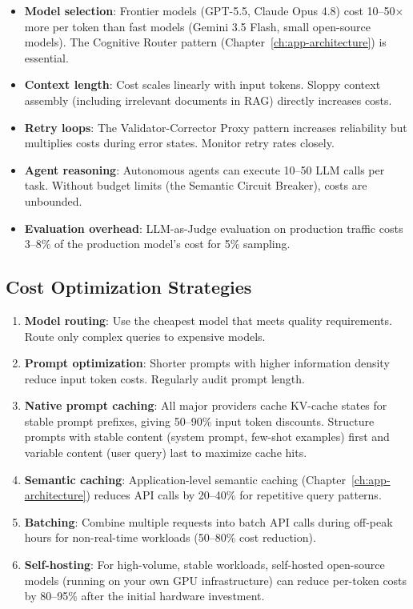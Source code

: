 \begin{itemize}[leftmargin=*]
    \item \textbf{Model selection}: Frontier models (GPT-5.5, Claude Opus 4.8) cost 10--50$\times$ more per token than fast models (Gemini 3.5 Flash, small open-source models). The Cognitive Router pattern (Chapter~\ref{ch:app-architecture}) is essential.
    \item \textbf{Context length}: Cost scales linearly with input tokens. Sloppy context assembly (including irrelevant documents in RAG) directly increases costs.
    \item \textbf{Retry loops}: The Validator-Corrector Proxy pattern increases reliability but multiplies costs during error states. Monitor retry rates closely.
    \item \textbf{Agent reasoning}: Autonomous agents can execute 10--50 LLM calls per task. Without budget limits (the Semantic Circuit Breaker), costs are unbounded.
    \item \textbf{Evaluation overhead}: LLM-as-Judge evaluation on production traffic costs 3--8\% of the production model's cost for 5\% sampling.
\end{itemize}

\subsection{Cost Optimization Strategies}

\begin{enumerate}[leftmargin=*]
    \item \textbf{Model routing}: Use the cheapest model that meets quality requirements. Route only complex queries to expensive models.
    \item \textbf{Prompt optimization}: Shorter prompts with higher information density reduce input token costs. Regularly audit prompt length.
    \item \textbf{Native prompt caching}: All major providers cache KV-cache states for stable prompt prefixes, giving 50--90\% input token discounts. Structure prompts with stable content (system prompt, few-shot examples) first and variable content (user query) last to maximize cache hits.
    \item \textbf{Semantic caching}: Application-level semantic caching (Chapter~\ref{ch:app-architecture}) reduces API calls by 20--40\% for repetitive query patterns.
    \item \textbf{Batching}: Combine multiple requests into batch API calls during off-peak hours for non-real-time workloads (50--80\% cost reduction).
    \item \textbf{Self-hosting}: For high-volume, stable workloads, self-hosted open-source models (running on your own GPU infrastructure) can reduce per-token costs by 80--95\% after the initial hardware investment.
\end{enumerate}


